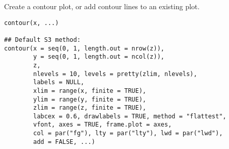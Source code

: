 %
\begin{Description}\relax
Create a contour plot, or add contour lines to an existing plot.
\end{Description}
%
\begin{Usage}
\begin{verbatim}
contour(x, ...)

## Default S3 method:
contour(x = seq(0, 1, length.out = nrow(z)),
        y = seq(0, 1, length.out = ncol(z)),
        z,
        nlevels = 10, levels = pretty(zlim, nlevels),
        labels = NULL,
        xlim = range(x, finite = TRUE),
        ylim = range(y, finite = TRUE),
        zlim = range(z, finite = TRUE),
        labcex = 0.6, drawlabels = TRUE, method = "flattest",
        vfont, axes = TRUE, frame.plot = axes,
        col = par("fg"), lty = par("lty"), lwd = par("lwd"),
        add = FALSE, ...)
\end{verbatim}
\end{Usage}
%
